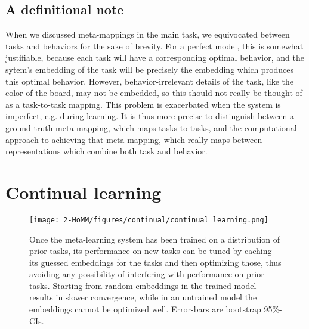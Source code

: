 \subsection{A definitional note}
When we discussed meta-mappings in the main task, we equivocated between tasks and behaviors for the sake of brevity. For a perfect model, this is somewhat justifiable, because each task will have a corresponding optimal behavior, and the sytem's embedding of the task will be precisely the embedding which produces this optimal behavior. However, behavior-irrelevant details of the task, like the color of the board, may not be embedded, so this should not really be thought of as a task-to-task mapping. This problem is exacerbated when the system is imperfect, e.g. during learning. It is thus more precise to distinguish between a ground-truth meta-mapping, which maps tasks to tasks, and the computational approach to achieving that meta-mapping, which really maps between representations which combine both task and behavior. \par
\section{Continual learning} \label{app_continual}
\begin{figure}[H]
\centering
\texttt{[image: 2-HoMM/figures/continual/continual\_learning.png]}
\caption{Once the meta-learning system has been trained on a distribution of prior tasks, its performance on new tasks can be tuned by caching its guessed embeddings for the tasks and then optimizing those, thus avoiding any possibility of interfering with performance on prior tasks. Starting from random embeddings in the trained model results in slower convergence, while in an untrained model the embeddings cannot be optimized well. Error-bars are bootstrap 95\%-CIs.}
\label{poly_continual_results}
\end{figure}
\vspace{-0.7em}

